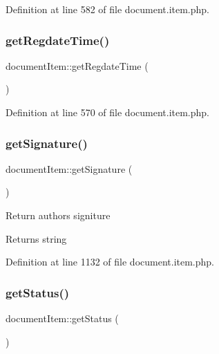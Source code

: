 Definition at line 582 of file document.\+item.\+php.

\hypertarget{classdocumentItem_ac5d8db0250cc8f448d9a76aaa3afa953}{}\label{classdocumentItem_ac5d8db0250cc8f448d9a76aaa3afa953} 
\subsubsection{\texorpdfstring{get\+Regdate\+Time()}{getRegdateTime()}}
{\footnotesize\ttfamily document\+Item\+::get\+Regdate\+Time (\begin{DoxyParamCaption}{ }\end{DoxyParamCaption})}



Definition at line 570 of file document.\+item.\+php.

\hypertarget{classdocumentItem_a03b199ae0def81ea3a9067bbb0186f17}{}\label{classdocumentItem_a03b199ae0def81ea3a9067bbb0186f17} 
\subsubsection{\texorpdfstring{get\+Signature()}{getSignature()}}
{\footnotesize\ttfamily document\+Item\+::get\+Signature (\begin{DoxyParamCaption}{ }\end{DoxyParamCaption})}

Return author\textquotesingle{}s signiture \begin{DoxyReturn}{Returns}
string 
\end{DoxyReturn}


Definition at line 1132 of file document.\+item.\+php.

\hypertarget{classdocumentItem_aa750ee0716698bf29c9690382b7fa3ef}{}\label{classdocumentItem_aa750ee0716698bf29c9690382b7fa3ef} 
\subsubsection{\texorpdfstring{get\+Status()}{getStatus()}}
{\footnotesize\ttfamily document\+Item\+::get\+Status (\begin{DoxyParamCaption}{ }\end{DoxyParamCaption})}



